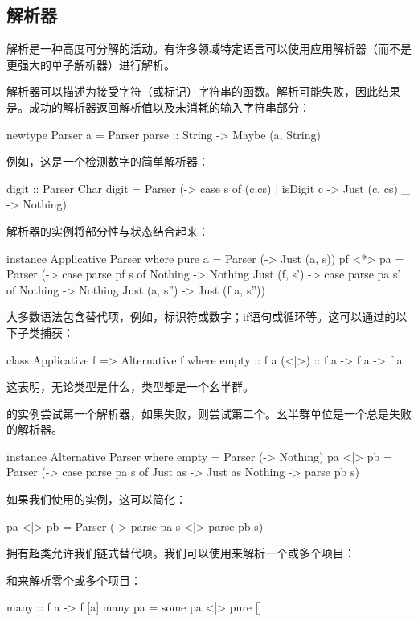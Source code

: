 \documentclass[DaoFP]{subfiles}
\begin{document}
\subsection{解析器}

解析是一种高度可分解的活动。有许多领域特定语言可以使用应用解析器（而不是更强大的单子解析器）进行解析。

解析器可以描述为接受字符（或标记）字符串的函数。解析可能失败，因此结果是。成功的解析器返回解析值以及未消耗的输入字符串部分：
\begin{haskell}
newtype Parser a = 
  Parser { parse :: String -> Maybe (a, String) }
\end{haskell}
例如，这是一个检测数字的简单解析器：
\begin{haskell}
digit :: Parser Char
digit = Parser (\s -> case s of
    (c:cs) | isDigit c -> Just (c, cs)
    _                  -> Nothing)
\end{haskell}
解析器的实例将部分性与状态结合起来：
\begin{haskell}
instance Applicative Parser where
  pure a = Parser (\s -> Just (a, s))
  pf <*> pa = Parser (\s ->
    case parse pf s of
      Nothing      -> Nothing
      Just (f, s') -> case parse pa s' of
          Nothing       -> Nothing
          Just (a, s'') -> Just (f a, s''))
\end{haskell}

大多数语法包含替代项，例如，标识符或数字；if语句或循环等。这可以通过的以下子类捕获：
\begin{haskell}
class Applicative f => Alternative f where
  empty :: f a
  (<|>) :: f a -> f a -> f a
\end{haskell}
这表明，无论类型是什么，类型都是一个幺半群。

的实例尝试第一个解析器，如果失败，则尝试第二个。幺半群单位是一个总是失败的解析器。
\begin{haskell}
instance Alternative Parser where
  empty = Parser (\s -> Nothing)
  pa <|> pb = Parser (\s ->
    case parse pa s of
      Just as -> Just as
      Nothing -> parse pb s)
 \end{haskell}
 如果我们使用的实例，这可以简化：
\begin{haskell}
  pa <|> pb = Parser (\s -> parse pa s <|> parse pb s)
 \end{haskell}
 拥有超类允许我们链式替代项。我们可以使用来解析一个或多个项目：
和来解析零个或多个项目：
\begin{haskell}
many :: f a -> f [a]
many pa = some pa <|> pure []
\end{haskell}
\end{document}

